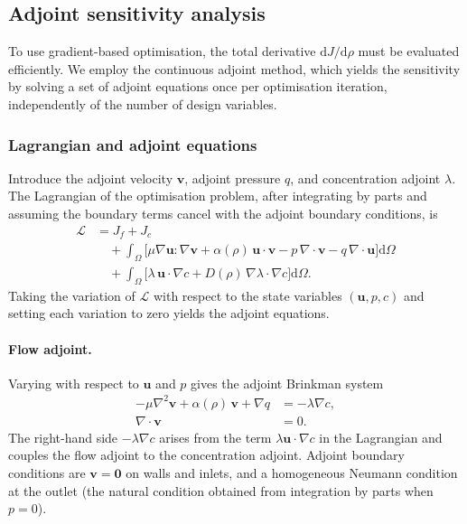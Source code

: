 \subsection{Adjoint sensitivity analysis}
\label{sec:adjoint}
To use gradient-based optimisation, the total derivative \(\mathrm{d}J/\mathrm{d}\rho\) must be evaluated efficiently.
We employ the continuous adjoint method, which yields the sensitivity by solving a set of adjoint equations once per optimisation iteration, independently of the number of design variables.

\subsubsection{Lagrangian and adjoint equations}
Introduce the adjoint velocity \(\mathbf{v}\), adjoint pressure \(q\), and concentration adjoint \(\lambda\).
The Lagrangian of the optimisation problem, after integrating by parts and assuming the boundary terms cancel with the adjoint boundary conditions, is
\begin{equation}
    \begin{aligned}
        \mathcal{L} &= J_f + J_c \\
        &\quad + \int_\Omega \bigl[ \mu\nabla\mathbf{u}:\nabla\mathbf{v} + \alpha(\rho)\,\mathbf{u}\cdot\mathbf{v} - p\,\nabla\cdot\mathbf{v} - q\,\nabla\cdot\mathbf{u} \bigr] \mathrm{d}\Omega \\
        &\quad + \int_\Omega \bigl[ \lambda\,\mathbf{u}\cdot\nabla c + D(\rho)\,\nabla\lambda\cdot\nabla c \bigr] \mathrm{d}\Omega .
    \end{aligned}
    \label{eq:lagrangian}
\end{equation}
Taking the variation of \(\mathcal{L}\) with respect to the state variables \((\mathbf{u},p,c)\) and setting each variation to zero yields the adjoint equations.

\paragraph{Flow adjoint.}
Varying with respect to \(\mathbf{u}\) and \(p\) gives the adjoint Brinkman system
\begin{subequations}
\begin{align}
    -\mu\nabla^2\mathbf{v} + \alpha(\rho)\,\mathbf{v} + \nabla q &= -\lambda\nabla c, \label{eq:adj_flow_mom}\\
    \nabla\cdot\mathbf{v} &= 0. \label{eq:adj_flow_div}
\end{align}
\end{subequations}
The right-hand side \(-\lambda\nabla c\) arises from the term \(\lambda\mathbf{u}\cdot\nabla c\) in the Lagrangian and couples the flow adjoint to the concentration adjoint.
Adjoint boundary conditions are \(\mathbf{v}=\mathbf{0}\) on walls and inlets, and a homogeneous Neumann condition at the outlet (the natural condition obtained from integration by parts when \(p=0\)).


